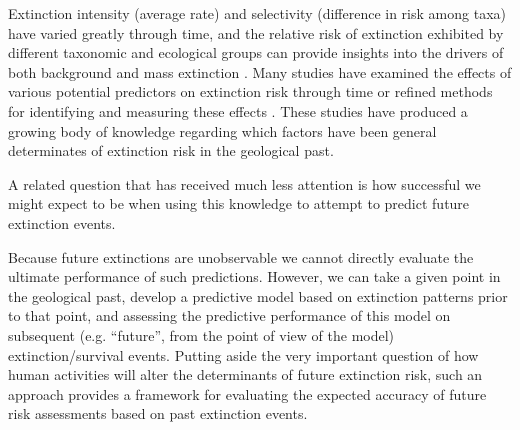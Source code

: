 \documentclass[12pt,letterpaper]{article}
\begin{document}
\begin{refsection}
Extinction intensity (average rate) and selectivity (difference in risk among taxa) have varied greatly through time, and the relative risk of extinction exhibited by different taxonomic and ecological groups can provide insights into the drivers of both background and mass extinction \citep{Payne2007,Payne2016,Ezard2011,Smits2019,Wang2008a,Knoll2007}. Many studies have examined the effects of various potential predictors on extinction risk through time \citep{Harnik2011,Smits2015,Peters2008,Payne2007,Harnik2012,Harnik2012a,Ezard2011,Foote2006} or refined methods for identifying and measuring these effects \citep{Alroy2010a,Alroy2014,Alroy2001,Alroy2000,Alroy2000b,Foote2001}. These studies have produced a growing body of knowledge regarding which factors have been general determinates of extinction risk in the geological past. 

A related question that has received much less attention is how successful we might expect to be when using this knowledge to attempt to predict future extinction events.

Because future extinctions are unobservable we cannot directly evaluate the ultimate performance of such predictions. However, we can take a given point in the geological past, develop a predictive model based on extinction patterns prior to that point, and assessing the predictive performance of this model on subsequent (e.g. ``future'', from the point of view of the model) extinction/survival events. Putting aside the very important question of how human activities will alter the determinants of future extinction risk, such an approach provides a framework for evaluating the expected accuracy of future risk assessments based on past extinction events.



\end{refsection}
\end{document}
